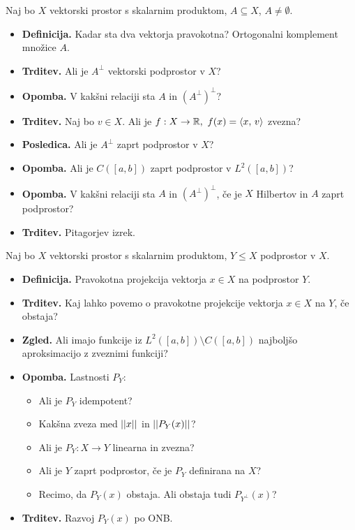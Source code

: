 \begin{enumerate}
    Naj bo \(X\) vektorski prostor s skalarnim produktom, \(A \subseteq X\), \(A \neq \emptyset\).
    \begin{itemize}
        \item \textbf{Definicija.} Kadar sta dva vektorja pravokotna? Ortogonalni komplement množice \(A\).
        \item \textbf{Trditev.} Ali je \(A^\perp\) vektorski podprostor v \(X\)?
        \item \textbf{Opomba.} V kakšni relaciji sta \(A\) in \((A^\perp)^\perp\)?
        \item \textbf{Trditev.} Naj bo \(v \in X\). Ali je \(f: X \to \mathbb{R}, \ f(x) = \left\langle x, \, v \right\rangle\) zvezna?
        \item \textbf{Posledica.} Ali je \(A^\perp\) zaprt podprostor v \(X\)?
        \item \textbf{Opomba.} Ali je \(C([a, b])\) zaprt podprostor v \(L^2([a,b])\)?
        \item \textbf{Opomba.} V kakšni relaciji sta \(A\) in \((A^\perp)^\perp\), če je \(X\) Hilbertov in \(A\) zaprt podprostor?
        \item \textbf{Trditev.} Pitagorjev izrek.
    \end{itemize}
    \newpage
    Naj bo \(X\) vektorski prostor s skalarnim produktom, \(Y \leq X\) podprostor v \(X\).
    \begin{itemize}
        \item \textbf{Definicija.} Pravokotna projekcija vektorja \(x \in X\) na podprostor \(Y\).
        \item \textbf{Trditev.} Kaj lahko povemo o pravokotne projekcije vektorja \(x \in X\) na \(Y\), če obstaja? \todo{*}
        \item \textbf{Zgled.} Ali imajo funkcije iz \(L^2([a, b]) \setminus C([a, b])\) najboljšo aproksimacijo z zveznimi funkciji?
        \item \textbf{Opomba.} Lastnosti \(P_Y\):
        \begin{itemize}
            \item Ali je \(P_Y\) idempotent?
            \item Kakšna zveza med \(||x||\) in \(||P_Y(x)||\)?
            \item Ali je \(P_Y: X \to Y\) linearna in zvezna?
            \item Ali je \(Y\) zaprt podprostor, če je \(P_Y\) definirana na \(X\)?
            \item Recimo, da \(P_Y(x)\) obstaja. Ali obstaja tudi \(P_{Y^\perp}(x)\)?
        \end{itemize}
        \item \textbf{Trditev.} Razvoj \(P_Y(x)\) po ONB.
    \end{itemize}


\end{enumerate}
